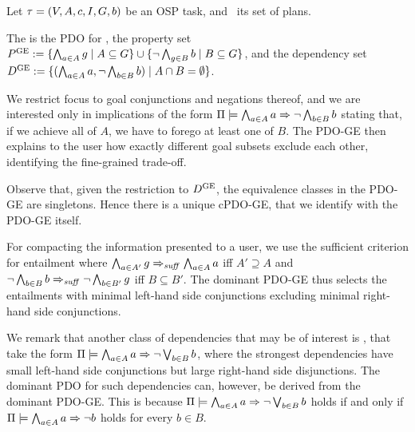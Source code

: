 \begin{definition}
Let $\tau =
(V,\allowbreak A,\allowbreak{\ensuremath{c}},\allowbreak I,\allowbreak G,\allowbreak{\ensuremath{b}})$
be an OSP task, and \plans\ its set of plans.  

The  is the PDO for
\plans, the property set ${P^{\text{\textup{GE}}}} := \{\bigwedge_{a \in A}
g\allowbreak\mid\allowbreak A \subseteq G\} \cup \{\neg \bigwedge_{g
  \in B} b \allowbreak\mid\allowbreak B \subseteq G\}$, and the
dependency set ${D^{\text{\textup{GE}}}} := \{(\bigwedge_{a \in A} a,\allowbreak\neg
\bigwedge_{b \in B} b) \allowbreak\mid\allowbreak A \cap B =
\emptyset\}$.
\end{definition}

We restrict focus to goal conjunctions and negations thereof, and we
are interested only in implications of the form
$\Pi \models \bigwedge_{a \in A} a \Rightarrow \neg \bigwedge_{b \in B} b$
stating that, if we achieve all of $A$, we have to forego at least one
of $B$. The PDO-GE then explains to the user how exactly different
goal subsets exclude each other, identifying the fine-grained
trade-off.

Observe that, given the restriction to ${D^{\text{\textup{GE}}}}$, the equivalence
classes in the PDO-GE are singletons. Hence there is a unique cPDO-GE,
that we identify with the PDO-GE itself.

For compacting the information presented to a user, we use the
sufficient criterion for entailment where $\bigwedge_{a \in A'} g
\Rightarrow_{\mathit{suff}} \bigwedge_{a \in A} a$ iff $A' \supseteq A$ and $\neg
\bigwedge_{b \in B} b \Rightarrow_{\mathit{suff}} \neg \bigwedge_{b \in B'} g$ iff $B
\subseteq B'$. The dominant PDO-GE thus selects the entailments with
minimal left-hand side conjunctions excluding minimal right-hand side
conjunctions.
%

We remark that another class of dependencies that may be of interest
is , that take the form
$\Pi \models \bigwedge_{a \in A} a \Rightarrow \neg \bigvee_{b \in B} b$,
where the strongest dependencies have small left-hand side
conjunctions but large right-hand side disjunctions. The dominant PDO
for such dependencies can, however, be derived from the dominant
PDO-GE. This is because $\Pi \models \bigwedge_{a \in A} a \Rightarrow \neg
  \bigvee_{b \in B} b$ holds if and only if
$\Pi \models \bigwedge_{a \in A} a \Rightarrow \neg b$ holds for every $b
\in B$.





